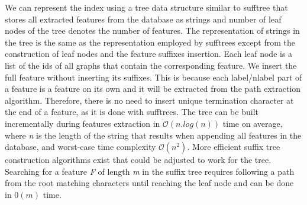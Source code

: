 \documentclass{l4proj}
\begin{document}
We can represent the index using a \gls{tree} data structure similar to \gls{sufftree} \cite{weiner:1973} that stores all extracted features from the database as strings and number of leaf nodes of the tree denotes the number of features. The representation of strings in the tree is the same as the representation employed by \glspl{sufftree} except from the construction of leaf nodes and the feature suffixes insertion. Each leaf node is a list of the ids of all graphs that contain the corresponding feature. We insert the full feature without inserting its suffixes. This is because each label/nlabel part of a feature is a feature on its own and it will be extracted from the path extraction algorithm. Therefore, there is no need to insert unique termination character at the end of a feature, as it is done with \glspl{sufftree}. The tree can be built incrementally during features extraction in $\mathcal{O}(n.log(n))$ time on average, where \emph{n} is the length of the string that results when appending all features in the database, and worst-case time complexity $\mathcal{O}(n^{2})$. More efficient suffix tree construction algorithms exist \cite{weiner:1973, McCreight:1976, Ukkonen:1995} that could be adjusted to work for the tree. Searching for a feature \emph{F} of length \emph{m} in the suffix tree requires following a path from the root matching characters until reaching the leaf node and can be done in $\mathcal{0}(m)$ time. %



\end{document}
